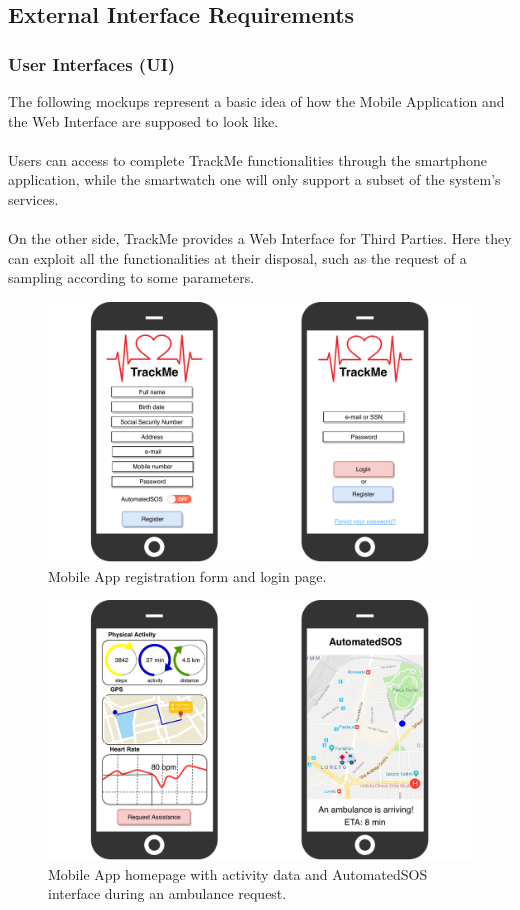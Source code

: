 \documentclass[12pt,a4paper]{article}
\begin{document}
		\subsection{External Interface Requirements}
				\subsubsection{User Interfaces (UI)}
					The following mockups represent a basic idea of how the Mobile Application and the Web Interface are supposed to look like.
					\\ \\
					Users can access to complete TrackMe functionalities through the smartphone application, while the smartwatch one will only support a subset of the system's services.
					\\ \\
					On the other side, TrackMe provides a Web Interface for Third Parties. Here they can exploit all the functionalities at their disposal, such as the request of a sampling according to some parameters.
					\begin{figure}[h]
						\centering
						\includegraphics[width=1.0\linewidth]{Images/login-registration.pdf}
						\caption{Mobile App registration form and login page.}
						\label{fig:login-registration}
					\end{figure}
					\begin{figure}[H]
						\centering
						\includegraphics[width=1.0\linewidth]{Images/pages}
						\caption{Mobile App homepage with activity data and AutomatedSOS interface during an ambulance request.}
					\end{figure}
\end{document}
